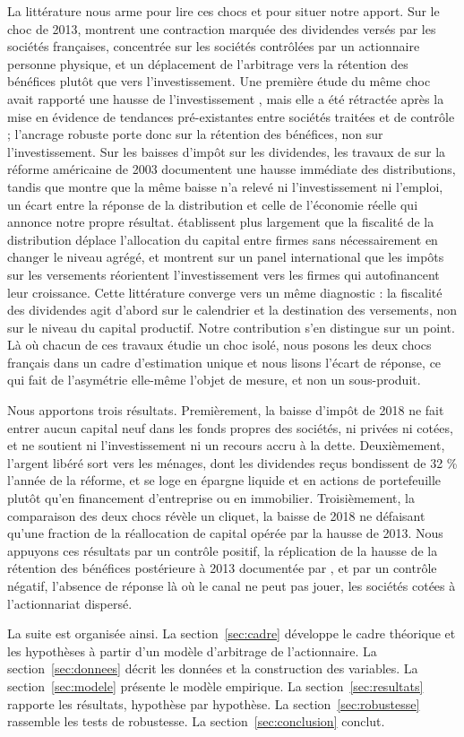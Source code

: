 La littérature nous arme pour lire ces chocs et pour situer notre apport. Sur le choc de 2013,
\citet{bach2023} montrent une contraction marquée des dividendes versés par les sociétés françaises,
concentrée sur les sociétés contrôlées par un actionnaire personne physique, et un déplacement de
l'arbitrage vers la rétention des bénéfices plutôt que vers l'investissement. Une première étude du
même choc avait rapporté une hausse de l'investissement \citep{boissel2022}, mais elle a été
rétractée après la mise en évidence de tendances pré-existantes entre sociétés traitées et de
contrôle \citep{bachcomment2023} ; l'ancrage robuste porte donc sur la rétention des bénéfices, non
sur l'investissement. Sur les baisses d'impôt sur les dividendes, les travaux de \citet{chetty2005}
sur la réforme américaine de 2003 documentent une hausse immédiate des distributions, tandis que
\citet{yagan2015} montre que la même baisse n'a relevé ni l'investissement ni l'emploi, un écart
entre la réponse de la distribution et celle de l'économie réelle qui annonce notre propre résultat.
\citet{alstadsater2017} établissent plus largement que la fiscalité de la distribution déplace
l'allocation du capital entre firmes sans nécessairement en changer le niveau agrégé, et
\citet{becker2013} montrent sur un panel international que les impôts sur les versements réorientent
l'investissement vers les firmes qui autofinancent leur croissance. Cette littérature converge vers
un même diagnostic : la fiscalité des dividendes agit d'abord sur le calendrier et la destination
des versements, non sur le niveau du capital productif. Notre contribution s'en distingue sur un
point. Là où chacun de ces travaux étudie un choc isolé, nous posons les deux chocs français dans un
cadre d'estimation unique et nous lisons l'écart de réponse, ce qui fait de l'asymétrie elle-même
l'objet de mesure, et non un sous-produit.

Nous apportons trois résultats. Premièrement, la baisse d'impôt de 2018 ne fait entrer aucun
capital neuf dans les fonds propres des sociétés, ni privées ni cotées, et ne soutient ni
l'investissement ni un recours accru à la dette. Deuxièmement, l'argent libéré sort vers les
ménages, dont les dividendes reçus bondissent de 32 \% l'année de la réforme, et se loge en épargne
liquide et en actions de portefeuille plutôt qu'en financement d'entreprise ou en immobilier.
Troisièmement, la comparaison des deux chocs révèle un cliquet, la baisse de 2018 ne défaisant qu'une
fraction de la réallocation de capital opérée par la hausse de 2013. Nous appuyons ces résultats par
un contrôle positif, la réplication de la hausse de la rétention des bénéfices postérieure à 2013
documentée par \citet{bach2023}, et par un contrôle négatif, l'absence de réponse là où le canal ne
peut pas jouer, les sociétés cotées à l'actionnariat dispersé.

La suite est organisée ainsi. La section~\ref{sec:cadre} développe le cadre théorique et les
hypothèses à partir d'un modèle d'arbitrage de l'actionnaire. La section~\ref{sec:donnees} décrit
les données et la construction des variables. La section~\ref{sec:modele} présente le modèle
empirique. La section~\ref{sec:resultats} rapporte les résultats, hypothèse par hypothèse. La
section~\ref{sec:robustesse} rassemble les tests de robustesse. La section~\ref{sec:conclusion}
conclut.
